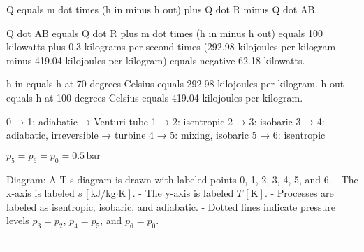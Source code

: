 Q equals m dot times (h in minus h out) plus Q dot R minus Q dot AB.  

Q dot AB equals Q dot R plus m dot times (h in minus h out) equals 100 kilowatts plus 0.3 kilograms per second times (292.98 kilojoules per kilogram minus 419.04 kilojoules per kilogram) equals negative 62.18 kilowatts.  

h in equals h at 70 degrees Celsius equals 292.98 kilojoules per kilogram.  
h out equals h at 100 degrees Celsius equals 419.04 kilojoules per kilogram.

0 → 1: adiabatic → Venturi tube  
1 → 2: isentropic  
2 → 3: isobaric  
3 → 4: adiabatic, irreversible → turbine  
4 → 5: mixing, isobaric  
5 → 6: isentropic  

\( p_5 = p_6 = p_0 = 0.5 \, \text{bar} \)  

Diagram:  
A T-s diagram is drawn with labeled points 0, 1, 2, 3, 4, 5, and 6.  
- The x-axis is labeled \( s \, [\text{kJ/kg·K}] \).  
- The y-axis is labeled \( T \, [\text{K}] \).  
- Processes are labeled as isentropic, isobaric, and adiabatic.  
- Dotted lines indicate pressure levels \( p_3 = p_2 \), \( p_4 = p_5 \), and \( p_6 = p_0 \).  

---